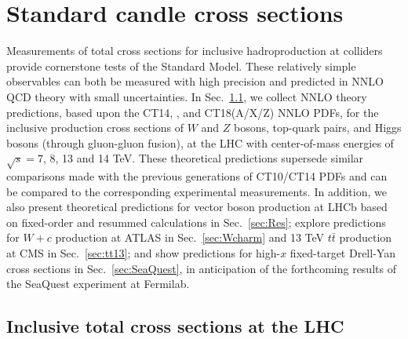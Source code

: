 \section{Standard candle cross sections
\label{sec:StandardCandles}
}

Measurements of total cross sections for inclusive hadroproduction at
colliders provide cornerstone tests of the Standard Model. These relatively simple
observables can both be measured with high precision and
predicted in NNLO QCD theory with small uncertainties.
In Sec.~\ref{sec:ellipse}, we collect NNLO theory predictions, based upon the CT14, \CTHERAII, and CT18(A/X/Z) 
NNLO PDFs, for the inclusive production cross sections of $W$ and $Z$ bosons, top-quark pairs, and Higgs bosons (through gluon-gluon fusion), at the
LHC with center-of-mass energies of $\sqrt{s} = 7$, 8, 13 and 14 TeV.
These theoretical predictions supersede similar comparisons made with the previous generations of CT10/CT14 PDFs \cite{Gao:2013xoa,Dulat:2015mca}
and can be compared to the corresponding experimental measurements. In addition, we also present theoretical predictions
for vector boson production at LHCb based on fixed-order and resummed calculations in Sec.~\ref{sec:Res}; explore
predictions for $W\!+\!c$ production at ATLAS in Sec.~\ref{sec:Wcharm} and 13 TeV $t\bar{t}$ production at CMS in Sec.~\ref{sec:tt13};
and show predictions for high-$x$ fixed-target Drell-Yan cross sections in Sec.~\ref{sec:SeaQuest}, in anticipation
of the forthcoming results of the SeaQuest experiment \cite{Aidala:2017ofy} at Fermilab.


\subsection{Inclusive total cross sections at the LHC}
\label{sec:ellipse}

